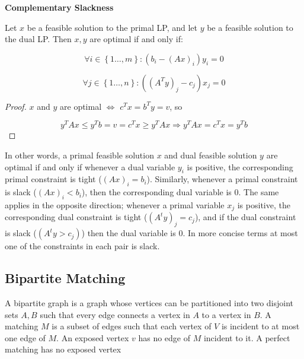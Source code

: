 \documentclass[../notes.tex]{subfiles}
\begin{document}


\begin{theorem}
    \textbf{Complementary Slackness}

    Let $ x $ be a feasible solution to the primal LP, and let $ y $ be a feasible solution to the dual LP. Then $ x, y $ are optimal if and only if:

    \begin{equation}
        \forall i \in \left\{  1 \ldots,  m \right\} : (b_i - (Ax)_i)y_i = 0
    \end{equation}

    \begin{equation}
        \forall j \in \left\{  1 \ldots,  n \right\} : ((A^Ty)_j - c_j)x_j = 0
    \end{equation}

    \begin{proof}
        $ x $ and $ y $ are optimal $ \iff $ $ c^Tx = b^Ty = v $, so

        \begin{equation}
            y^T Ax \le  y^T b = v = c^Tx \ge  y^T Ax \Rightarrow y^T Ax = c^Tx = y^T b
        \end{equation}


    \end{proof}
    
    In other words, a primal feasible solution $ x $ and dual feasible solution $ y $ are optimal if and only if whenever a dual variable $ y_i $ is positive, the corresponding primal constraint is tight ($ (Ax)_i = b_i$). Similarly, whenever a primal constraint is slack ($ (Ax)_i < b_i $), then the corresponding dual variable is 0. The same applies in the opposite direction; whenever a primal variable $ x_j $ is positive, the corresponding dual constraint is tight ($ (A^ty)_j = c_j $), and if the dual constraint is slack ($ (A^ty > c_j) $) then the dual variable is $ 0 $. In more concise terms at most one of the constraints in each pair is slack.

    
    



\end{theorem}


\subsection{Bipartite Matching}

A bipartite graph is a graph whose vertices can be partitioned into two disjoint sets $ A, B $ such that every edge connects a vertex in $ A $ to a vertex in $ B $. A matching $ M $ is a subset of edges such that each vertex of $ V $ is incident to at most one edge of $ M $. An exposed vertex $ v $ has no edge of $ M $ incident to it. A perfect matching has no exposed vertex
\end{document}
